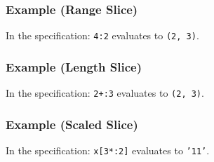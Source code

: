 \subsubsection{Example (Range Slice)}
In the specification:
\texttt{4:2} evaluates to \texttt{(2, 3)}.

\subsubsection{Example (Length Slice)}
In the specification:
\texttt{2+:3} evaluates to \texttt{(2, 3)}.

\subsubsection{Example (Scaled Slice)}
In the specification:
\texttt{x[3*:2]} evaluates to \texttt{'11'}.

